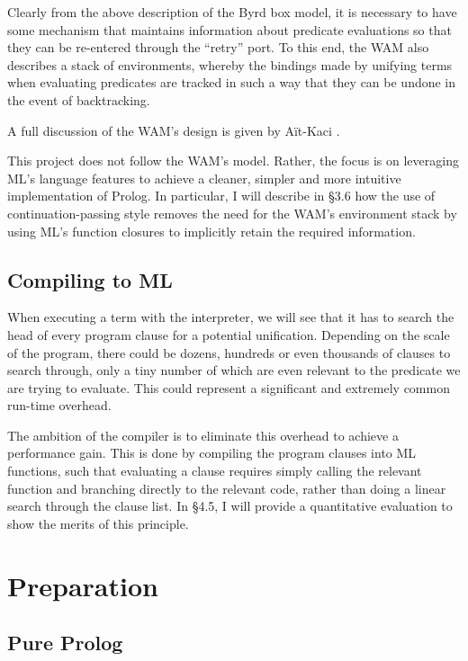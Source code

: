 \documentclass[12pt]{article}
\begin{document}
Clearly from the above description of the Byrd box model, it is necessary to have some mechanism that maintains information about predicate evaluations so that they can be re-entered through the ``retry'' port. 
To this end, the WAM also describes a stack of environments, whereby the bindings made by unifying terms when evaluating predicates are tracked in such a way that they can be undone in the event of backtracking. 

A full discussion of the WAM's design is given by A\"it-Kaci \cite{wam91}.

This project does not follow the WAM's model. 
Rather, the focus is on leveraging ML's language features to achieve a cleaner, simpler and more intuitive implementation of Prolog. 
In particular, I will describe in \S3.6 how the use of continuation-passing style removes the need for the WAM's environment stack by using ML's function closures to implicitly retain the required information.

\subsection{Compiling to ML}

When executing a term with the interpreter, we will see that it has to search the head of every program clause for a potential unification. 
Depending on the scale of the program, there could be dozens, hundreds or even thousands of clauses to search through, only a tiny number of which are even relevant to the predicate we are trying to evaluate.
This could represent a significant and extremely common run-time overhead. 

The ambition of the compiler is to eliminate this overhead to achieve a performance gain. 
This is done by compiling the program clauses into ML functions, such that evaluating a clause requires simply calling the relevant function and branching directly to the relevant code, rather than doing a linear search through the clause list.
In \S4.5, I will provide a quantitative evaluation to show the merits of this principle.

\newpage

\section{Preparation}


\subsection{Pure Prolog}
\end{document}
